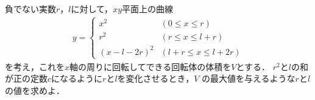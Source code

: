 \documentclass[a4j]{jarticle}
\begin{document}

     \begin{oframed}
     負でない実数$r$，$l$に対して，$xy$平面上の曲線
          \begin{align*}
          y=
               \begin{cases}
               x^2&(0\le x\le r) \\
               r^2 &(r\le x\le l+r) \\
               (x-l-2r)^2&(l+r\le x\le l+2r)
               \end{cases}
          \end{align*}
     を考え，これを$x$軸の周りに回転してできる回転体の体積を$V$とする．
     $r^2$と$l$の和が正の定数$c$になるように$r$と$l$を変化させるとき，$V$
     の最大値を与えるような$r$と$l$の値を求めよ．
     \end{oframed}
\end{document}
